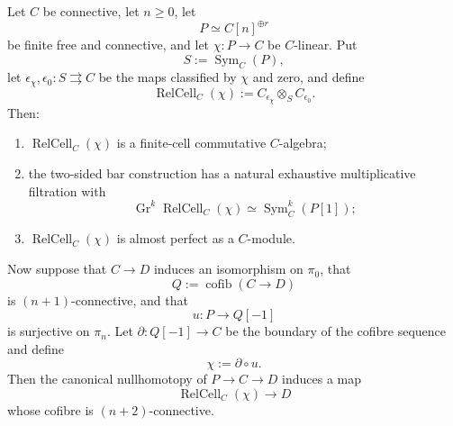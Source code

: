 \begin{lemma}
\label{lem:positive-relation-cell}
Let \(C\) be connective, let \(n\geq0\), let
\[
    P\simeq C[n]^{\oplus r}
\]
be finite free and connective, and let \(\chi:P\to C\) be \(C\)-linear. Put
\[
    S:=\operatorname{Sym}_C(P),
\]
let \(\epsilon_\chi,\epsilon_0:S\rightrightarrows C\) be the maps classified
by \(\chi\) and zero, and define
\[
    \operatorname{RelCell}_C(\chi)
    :=
    C_{\epsilon_\chi}\otimes_SC_{\epsilon_0}.
\]
Then:
\begin{enumerate}[label=(\roman*)]
    \item \(\operatorname{RelCell}_C(\chi)\) is a finite-cell commutative \(C\)-algebra;
    \item the two-sided bar construction has a natural exhaustive
    multiplicative filtration with
    \[
        \operatorname{Gr}^k\operatorname{RelCell}_C(\chi)
        \simeq
        \operatorname{Sym}^k_C(P[1]);
    \]
    \item \(\operatorname{RelCell}_C(\chi)\) is almost perfect as a \(C\)-module.
\end{enumerate}
Now suppose that \(C\to D\) induces an isomorphism on \(\pi_0\), that
\[
    Q:=\operatorname{cofib}(C\to D)
\]
is \((n+1)\)-connective, and that
\[
    u:P\longrightarrow Q[-1]
\]
is surjective on \(\pi_n\). Let \(\partial:Q[-1]\to C\) be the boundary
of the cofibre sequence and define
\[
    \chi:=\partial\circ u.
\]
Then the canonical nullhomotopy of \(P\to C\to D\) induces a map
\[
    \operatorname{RelCell}_C(\chi)\longrightarrow D
\]
whose cofibre is \((n+2)\)-connective.
\end{lemma}

